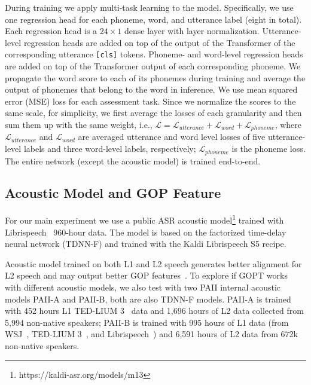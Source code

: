 \documentclass{article}
\begin{document}
During training we apply multi-task learning to the model. Specifically, we use one regression head for each phoneme, word, and utterance label (eight in total). Each regression head is a $24\times1$ dense layer with layer normalization. Utterance-level regression heads are added on top of the output of the Transformer of the corresponding utterance \texttt{[cls]} tokens. Phoneme- and word-level regression heads are added on top of the Transformer output of each corresponding phoneme. We propagate the word score to each of its phonemes during training and average the output of phonemes that belong to the word in inference. We use mean squared error (MSE) loss for each assessment task. Since we normalize the scores to the same scale, for simplicity, we first average the losses of each granularity and then sum them up with the same weight, i.e., $\mathcal{L} = \mathcal{L}_{utterance} + \mathcal{L}_{word}+ \mathcal{L}_{phoneme}$, where $\mathcal{L}_{utterance}$ and $\mathcal{L}_{word}$ are averaged utterance and word level losses of five utterance-level labels and three word-level labels, respectively; $\mathcal{L}_{phoneme}$ is the phoneme loss. The entire network (except the acoustic model) is trained end-to-end. 



\subsection{Acoustic Model and GOP Feature}
\label{sec:am}

For our main experiment we use a public ASR acoustic model\footnote{https://kaldi-asr.org/models/m13} trained with Librispeech~\cite{panayotov2015librispeech} 960-hour data. The model is based on the factorized time-delay neural network (TDNN-F) and trained with the Kaldi Librispeech S5 recipe. 

Acoustic model trained on both L1 and L2 speech generates better alignment for L2 speech and may output better GOP features~\cite{tu2018investigating}. To explore if GOPT works with different acoustic models, we also test with two PAII internal acoustic models PAII-A and PAII-B, both are also TDNN-F models. PAII-A is trained with 452 hours L1 TED-LIUM 3~\cite{hernandez2018ted} data and 1,696 hours of L2 data collected from 5,994 non-native speakers; PAII-B is trained with 995 hours of L1 data (from WSJ~\cite{marcus1993building}, TED-LIUM 3~\cite{hernandez2018ted}, and Librispeech~\cite{panayotov2015librispeech}) and 6,591 hours of L2 data from 672k non-native speakers.
\end{document}
